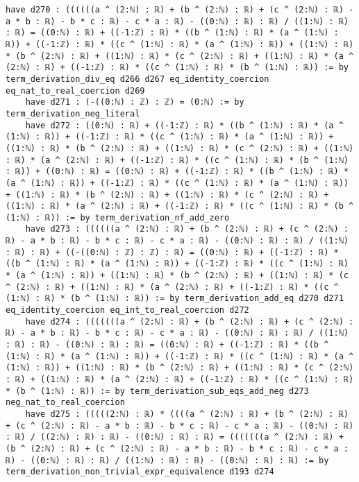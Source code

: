 \documentclass{article}
\begin{document}
\begin{tcolorbox}[colback=white!10, width=\linewidth]
\begin{lstlisting}[language=Lean4]
    have d270 : ((((((a ^ (2:ℕ) : ℝ) + (b ^ (2:ℕ) : ℝ) + (c ^ (2:ℕ) : ℝ) - a * b : ℝ) - b * c : ℝ) - c * a : ℝ) - ((0:ℕ) : ℝ) : ℝ) / ((1:ℕ) : ℝ) : ℝ) = ((0:ℕ) : ℝ) + ((-1:ℤ) : ℝ) * ((b ^ (1:ℕ) : ℝ) * (a ^ (1:ℕ) : ℝ)) + ((-1:ℤ) : ℝ) * ((c ^ (1:ℕ) : ℝ) * (a ^ (1:ℕ) : ℝ)) + ((1:ℕ) : ℝ) * (b ^ (2:ℕ) : ℝ) + ((1:ℕ) : ℝ) * (c ^ (2:ℕ) : ℝ) + ((1:ℕ) : ℝ) * (a ^ (2:ℕ) : ℝ) + ((-1:ℤ) : ℝ) * ((c ^ (1:ℕ) : ℝ) * (b ^ (1:ℕ) : ℝ)) := by term_derivation_div_eq d266 d267 eq_identity_coercion eq_nat_to_real_coercion d269
    have d271 : (-((0:ℕ) : ℤ) : ℤ) = (0:ℕ) := by term_derivation_neg_literal
    have d272 : ((0:ℕ) : ℝ) + ((-1:ℤ) : ℝ) * ((b ^ (1:ℕ) : ℝ) * (a ^ (1:ℕ) : ℝ)) + ((-1:ℤ) : ℝ) * ((c ^ (1:ℕ) : ℝ) * (a ^ (1:ℕ) : ℝ)) + ((1:ℕ) : ℝ) * (b ^ (2:ℕ) : ℝ) + ((1:ℕ) : ℝ) * (c ^ (2:ℕ) : ℝ) + ((1:ℕ) : ℝ) * (a ^ (2:ℕ) : ℝ) + ((-1:ℤ) : ℝ) * ((c ^ (1:ℕ) : ℝ) * (b ^ (1:ℕ) : ℝ)) + ((0:ℕ) : ℝ) = ((0:ℕ) : ℝ) + ((-1:ℤ) : ℝ) * ((b ^ (1:ℕ) : ℝ) * (a ^ (1:ℕ) : ℝ)) + ((-1:ℤ) : ℝ) * ((c ^ (1:ℕ) : ℝ) * (a ^ (1:ℕ) : ℝ)) + ((1:ℕ) : ℝ) * (b ^ (2:ℕ) : ℝ) + ((1:ℕ) : ℝ) * (c ^ (2:ℕ) : ℝ) + ((1:ℕ) : ℝ) * (a ^ (2:ℕ) : ℝ) + ((-1:ℤ) : ℝ) * ((c ^ (1:ℕ) : ℝ) * (b ^ (1:ℕ) : ℝ)) := by term_derivation_nf_add_zero
    have d273 : ((((((a ^ (2:ℕ) : ℝ) + (b ^ (2:ℕ) : ℝ) + (c ^ (2:ℕ) : ℝ) - a * b : ℝ) - b * c : ℝ) - c * a : ℝ) - ((0:ℕ) : ℝ) : ℝ) / ((1:ℕ) : ℝ) : ℝ) + ((-((0:ℕ) : ℤ) : ℤ) : ℝ) = ((0:ℕ) : ℝ) + ((-1:ℤ) : ℝ) * ((b ^ (1:ℕ) : ℝ) * (a ^ (1:ℕ) : ℝ)) + ((-1:ℤ) : ℝ) * ((c ^ (1:ℕ) : ℝ) * (a ^ (1:ℕ) : ℝ)) + ((1:ℕ) : ℝ) * (b ^ (2:ℕ) : ℝ) + ((1:ℕ) : ℝ) * (c ^ (2:ℕ) : ℝ) + ((1:ℕ) : ℝ) * (a ^ (2:ℕ) : ℝ) + ((-1:ℤ) : ℝ) * ((c ^ (1:ℕ) : ℝ) * (b ^ (1:ℕ) : ℝ)) := by term_derivation_add_eq d270 d271 eq_identity_coercion eq_int_to_real_coercion d272
    have d274 : (((((((a ^ (2:ℕ) : ℝ) + (b ^ (2:ℕ) : ℝ) + (c ^ (2:ℕ) : ℝ) - a * b : ℝ) - b * c : ℝ) - c * a : ℝ) - ((0:ℕ) : ℝ) : ℝ) / ((1:ℕ) : ℝ) : ℝ) - ((0:ℕ) : ℝ) : ℝ) = ((0:ℕ) : ℝ) + ((-1:ℤ) : ℝ) * ((b ^ (1:ℕ) : ℝ) * (a ^ (1:ℕ) : ℝ)) + ((-1:ℤ) : ℝ) * ((c ^ (1:ℕ) : ℝ) * (a ^ (1:ℕ) : ℝ)) + ((1:ℕ) : ℝ) * (b ^ (2:ℕ) : ℝ) + ((1:ℕ) : ℝ) * (c ^ (2:ℕ) : ℝ) + ((1:ℕ) : ℝ) * (a ^ (2:ℕ) : ℝ) + ((-1:ℤ) : ℝ) * ((c ^ (1:ℕ) : ℝ) * (b ^ (1:ℕ) : ℝ)) := by term_derivation_sub_eqs_add_neg d273 neg_nat_to_real_coercion
    have d275 : (((((2:ℕ) : ℝ) * ((((a ^ (2:ℕ) : ℝ) + (b ^ (2:ℕ) : ℝ) + (c ^ (2:ℕ) : ℝ) - a * b : ℝ) - b * c : ℝ) - c * a : ℝ) - ((0:ℕ) : ℝ) : ℝ) / ((2:ℕ) : ℝ) : ℝ) - ((0:ℕ) : ℝ) : ℝ) = (((((((a ^ (2:ℕ) : ℝ) + (b ^ (2:ℕ) : ℝ) + (c ^ (2:ℕ) : ℝ) - a * b : ℝ) - b * c : ℝ) - c * a : ℝ) - ((0:ℕ) : ℝ) : ℝ) / ((1:ℕ) : ℝ) : ℝ) - ((0:ℕ) : ℝ) : ℝ) := by term_derivation_non_trivial_expr_equivalence d193 d274

\end{lstlisting}
\end{tcolorbox}
\end{document}
